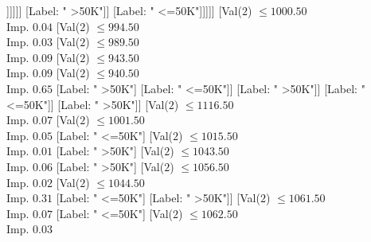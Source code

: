 \documentclass[margin=10pt]{standalone}
\begin{document}
\begin{forest}
																													[Val($2$) $ \leq 805.50$ \\ Imp. $0.12$
																														[Label: " >50K"]
																														[Val($2$) $ \leq 823.50$ \\ Imp. $0.09$
																															[Label: " <=50K"]
																															[Val($2$) $ \leq 839.50$ \\ Imp. $0.10$
																																[Label: " >50K"]
																																[Val($2$) $ \leq 884.50$ \\ Imp. $0.01$
																																	[Label: " >50K"]
																																	[Label: " <=50K"]]]]]]
																												[Label: " >50K"]]
																											[Label: " <=50K"]]]]]
																							[Val($2$) $ \leq 1000.50$ \\ Imp. $0.04$
																								[Val($2$) $ \leq 994.50$ \\ Imp. $0.03$
																									[Val($2$) $ \leq 989.50$ \\ Imp. $0.09$
																										[Val($2$) $ \leq 943.50$ \\ Imp. $0.09$
																											[Val($2$) $ \leq 940.50$ \\ Imp. $0.65$
																												[Label: " >50K"]
																												[Label: " <=50K"]]
																											[Label: " >50K"]]
																										[Label: " <=50K"]]
																									[Label: " >50K"]]
																								[Val($2$) $ \leq 1116.50$ \\ Imp. $0.07$
																									[Val($2$) $ \leq 1001.50$ \\ Imp. $0.05$
																										[Label: " <=50K"]
																										[Val($2$) $ \leq 1015.50$ \\ Imp. $0.01$
																											[Label: " >50K"]
																											[Val($2$) $ \leq 1043.50$ \\ Imp. $0.06$
																												[Label: " >50K"]
																												[Val($2$) $ \leq 1056.50$ \\ Imp. $0.02$
																													[Val($2$) $ \leq 1044.50$ \\ Imp. $0.31$
																														[Label: " <=50K"]
																														[Label: " >50K"]]
																													[Val($2$) $ \leq 1061.50$ \\ Imp. $0.07$
																														[Label: " <=50K"]
																														[Val($2$) $ \leq 1062.50$ \\ Imp. $0.03$

\end{forest}
\end{document}
